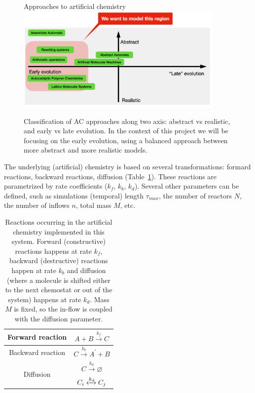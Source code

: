 \documentclass[11pt]{book}
\begin{document}
\begin{figure}[hbt]
  \centering
  {\LARGE Approaches to artificial chemistry}\vspace{1em}\\
  \includegraphics[width=0.90\textwidth]{figures/system/abstraction-stage.pdf}
  \caption{Classification of AC approaches along two axis: abstract vs realistic, and early vs late evolution. In the context of this project we will be focusing on the early evolution, using a balanced approach between more abstract and more realistic models.}
  \label{fig:abstraction-stage}
\end{figure}

The underlying (artificial) chemistry is based on several transformations: formard reactions, backward reactions, diffusion (Table~\ref{tab:reactions}). These reactions are parametrized by rate coefficients ($k_f$, $k_b$, $k_d$). Several other parameters can be defined, such as simulations (temporal) length $\tau_{max}$, the number of reactors $N$, the number of inflows $n$, total mass $M$, etc.

\begin{table}[h]
\centering
\begin{tabular}{|c|c|}
\hline Forward reaction & $A+B \xrightarrow{k_f} C$ \\
\hline Backward reaction & $C \xrightarrow{k_b} A^{\prime}+B$ \\
\hline \multirow{2}{*}{ Diffusion } & $C \xrightarrow{k_d} \varnothing$ \\
\cline { 2 - 2 } & $C_i \xleftrightarrow{k_d} C_j$ \\
\hline
\end{tabular}  
\caption{Reactions occurring in the artificial chemistry implemented in this system. Forward (constructive) reactions happens at rate $k_f$, backward (destructive) reactions happen at rate $k_b$ and diffusion (where a molecule is shifted either to the next chemostat or out of the system) happens at rate $k_d$. Mass $M$ is fixed, so the in-flow is coupled with the diffusion parameter.}
\label{tab:reactions}
\end{table}
\end{document}
